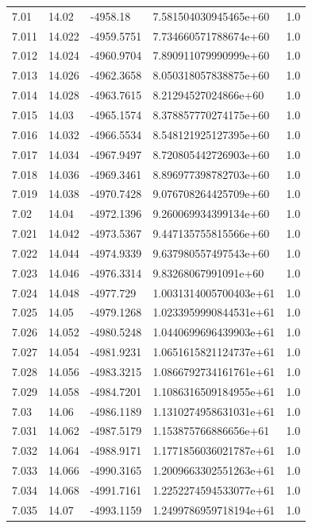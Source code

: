 \begin{tabular}{lllll}
7.01 & 14.02 & -4958.18 & 7.581504030945465e+60 & 1.0 \\
7.011 & 14.022 & -4959.5751 & 7.734660571788674e+60 & 1.0 \\
7.012 & 14.024 & -4960.9704 & 7.890911079990999e+60 & 1.0 \\
7.013 & 14.026 & -4962.3658 & 8.050318057838875e+60 & 1.0 \\
7.014 & 14.028 & -4963.7615 & 8.21294527024866e+60 & 1.0 \\
7.015 & 14.03 & -4965.1574 & 8.378857770274175e+60 & 1.0 \\
7.016 & 14.032 & -4966.5534 & 8.548121925127395e+60 & 1.0 \\
7.017 & 14.034 & -4967.9497 & 8.720805442726903e+60 & 1.0 \\
7.018 & 14.036 & -4969.3461 & 8.896977398782703e+60 & 1.0 \\
7.019 & 14.038 & -4970.7428 & 9.076708264425709e+60 & 1.0 \\
7.02 & 14.04 & -4972.1396 & 9.260069934399134e+60 & 1.0 \\
7.021 & 14.042 & -4973.5367 & 9.447135755815566e+60 & 1.0 \\
7.022 & 14.044 & -4974.9339 & 9.637980557497543e+60 & 1.0 \\
7.023 & 14.046 & -4976.3314 & 9.83268067991091e+60 & 1.0 \\
7.024 & 14.048 & -4977.729 & 1.0031314005700403e+61 & 1.0 \\
7.025 & 14.05 & -4979.1268 & 1.0233959990844531e+61 & 1.0 \\
7.026 & 14.052 & -4980.5248 & 1.0440699696439903e+61 & 1.0 \\
7.027 & 14.054 & -4981.9231 & 1.0651615821124737e+61 & 1.0 \\
7.028 & 14.056 & -4983.3215 & 1.0866792734161761e+61 & 1.0 \\
7.029 & 14.058 & -4984.7201 & 1.1086316509184955e+61 & 1.0 \\
7.03 & 14.06 & -4986.1189 & 1.1310274958631031e+61 & 1.0 \\
7.031 & 14.062 & -4987.5179 & 1.153875766886656e+61 & 1.0 \\
7.032 & 14.064 & -4988.9171 & 1.1771856036021787e+61 & 1.0 \\
7.033 & 14.066 & -4990.3165 & 1.2009663302551263e+61 & 1.0 \\
7.034 & 14.068 & -4991.7161 & 1.2252274594533077e+61 & 1.0 \\
7.035 & 14.07 & -4993.1159 & 1.2499786959718194e+61 & 1.0 \\

\end{tabular}
